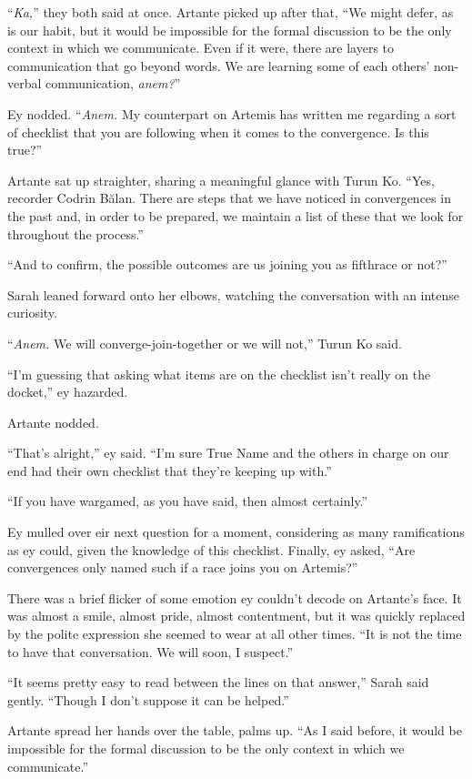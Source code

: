 ``\emph{Ka,}'' they both said at once. Artante picked up after that, ``We might defer, as is our habit, but it would be impossible for the formal discussion to be the only context in which we communicate. Even if it were, there are layers to communication that go beyond words. We are learning some of each others' non-verbal communication, \emph{anem?}''

Ey nodded. ``\emph{Anem.} My counterpart on Artemis has written me regarding a sort of checklist that you are following when it comes to the convergence. Is this true?''

Artante sat up straighter, sharing a meaningful glance with Turun Ko. ``Yes, recorder Codrin Bălan. There are steps that we have noticed in convergences in the past and, in order to be prepared, we maintain a list of these that we look for throughout the process.''

``And to confirm, the possible outcomes are us joining you as fifthrace or not?''

Sarah leaned forward onto her elbows, watching the conversation with an intense curiosity.

``\emph{Anem.} We will converge-join-together or we will not,'' Turun Ko said.

``I'm guessing that asking what items are on the checklist isn't really on the docket,'' ey hazarded.

Artante nodded.

``That's alright,'' ey said. ``I'm sure True Name and the others in charge on our end had their own checklist that they're keeping up with.''

``If you have wargamed, as you have said, then almost certainly.''

Ey mulled over eir next question for a moment, considering as many ramifications as ey could, given the knowledge of this checklist. Finally, ey asked, ``Are convergences only named such if a race joins you on Artemis?''

There was a brief flicker of some emotion ey couldn't decode on Artante's face. It was almost a smile, almost pride, almost contentment, but it was quickly replaced by the polite expression she seemed to wear at all other times. ``It is not the time to have that conversation. We will soon, I suspect.''

``It seems pretty easy to read between the lines on that answer,'' Sarah said gently. ``Though I don't suppose it can be helped.''

Artante spread her hands over the table, palms up. ``As I said before, it would be impossible for the formal discussion to be the only context in which we communicate.''

